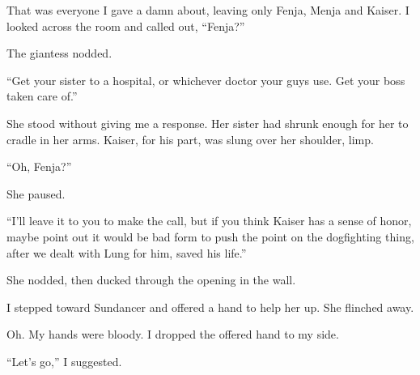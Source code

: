 That was everyone I gave a damn about, leaving only Fenja, Menja and Kaiser.  I looked across the room and called out, ``Fenja?''



The giantess nodded.



``Get your sister to a hospital, or whichever doctor your guys use.  Get your boss taken care of.''



She stood without giving me a response.  Her sister had shrunk enough for her to cradle in her arms.  Kaiser, for his part, was slung over her shoulder, limp.



``Oh, Fenja?''



She paused.



``I'll leave it to you to make the call, but if you think Kaiser has a sense of honor, maybe point out it would be bad form to push the point on the dogfighting thing, after we dealt with Lung for him, saved his life.''



She nodded, then ducked through the opening in the wall.



I stepped toward Sundancer and offered a hand to help her up.  She flinched away.



Oh.  My hands were bloody.  I dropped the offered hand to my side.



``Let's go,'' I suggested.





